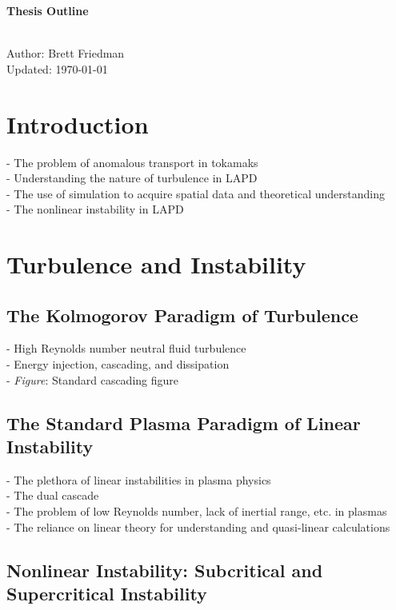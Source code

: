 \documentclass[12pt]{article}
\begin{document}
{\bf \large Thesis Outline \\ \\}

Author: Brett Friedman \\
Updated: \today \\

\section{Introduction}

- The problem of anomalous transport in tokamaks \\
- Understanding the nature of turbulence in LAPD \\
- The use of simulation to acquire spatial data and theoretical understanding \\
- The nonlinear instability in LAPD \\

\section{Turbulence and Instability}

\subsection{The Kolmogorov Paradigm of Turbulence}

- High Reynolds number neutral fluid turbulence \\
- Energy injection, cascading, and dissipation \\
- \emph{Figure}: Standard cascading figure \\

\subsection{The Standard Plasma Paradigm of Linear Instability}

- The plethora of linear instabilities in plasma physics \\
- The dual cascade \\
- The problem of low Reynolds number, lack of inertial range, etc. in plasmas \\
- The reliance on linear theory for understanding and quasi-linear calculations \\

\subsection{Nonlinear Instability: Subcritical and Supercritical Instability}
\end{document}
